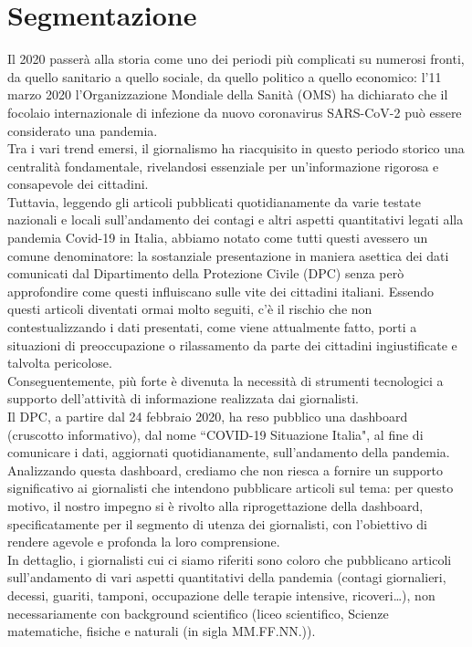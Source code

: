 \section{Segmentazione}
\label{s:segmentazione}
Il 2020 passerà alla storia come uno dei periodi più complicati su numerosi fronti, da quello sanitario a quello sociale, 
da quello politico a quello economico: l'11 marzo 2020 l'Organizzazione Mondiale della Sanità (OMS) ha dichiarato che il 
focolaio internazionale di infezione da nuovo coronavirus SARS-CoV-2 può essere considerato una pandemia.\\
Tra i vari trend emersi, il giornalismo ha riacquisito in questo periodo storico una centralità fondamentale, rivelandosi 
essenziale per un'informazione rigorosa e consapevole dei cittadini.\\
Tuttavia, leggendo gli articoli pubblicati quotidianamente da varie testate nazionali e locali sull'andamento dei contagi 
e altri aspetti quantitativi legati alla pandemia Covid-19 in Italia, abbiamo notato come tutti questi avessero un comune 
denominatore: la sostanziale presentazione in maniera asettica dei dati comunicati dal Dipartimento della Protezione Civile 
(DPC) senza però approfondire come questi influiscano sulle vite dei cittadini italiani. Essendo questi articoli diventati 
ormai molto seguiti, c'è il rischio che non contestualizzando i dati presentati, come viene attualmente fatto, porti a 
situazioni di preoccupazione o rilassamento da parte dei cittadini ingiustificate e talvolta pericolose.\\
Conseguentemente, più forte è divenuta la necessità di strumenti tecnologici a supporto dell'attività di informazione 
realizzata dai giornalisti.\\
Il DPC, a partire dal 24 febbraio 2020, ha reso pubblico una dashboard (cruscotto informativo), dal nome ``COVID-19 Situazione Italia", 
al fine di comunicare i dati, aggiornati quotidianamente, sull'andamento della pandemia.\\
Analizzando questa dashboard, crediamo che non riesca a fornire un supporto significativo ai giornalisti che intendono pubblicare 
articoli sul tema: per questo motivo, il nostro impegno si è rivolto alla riprogettazione della dashboard, specificatamente per il 
segmento di utenza dei giornalisti, con l'obiettivo di rendere agevole e profonda la loro comprensione.\\
In dettaglio, i giornalisti cui ci siamo riferiti sono coloro che pubblicano articoli sull'andamento di vari aspetti quantitativi della pandemia (contagi giornalieri, decessi, guariti, tamponi, occupazione delle terapie intensive, ricoveri\dots), non necessariamente con background scientifico (liceo scientifico, Scienze matematiche, fisiche e naturali (in sigla MM.FF.NN.)).
